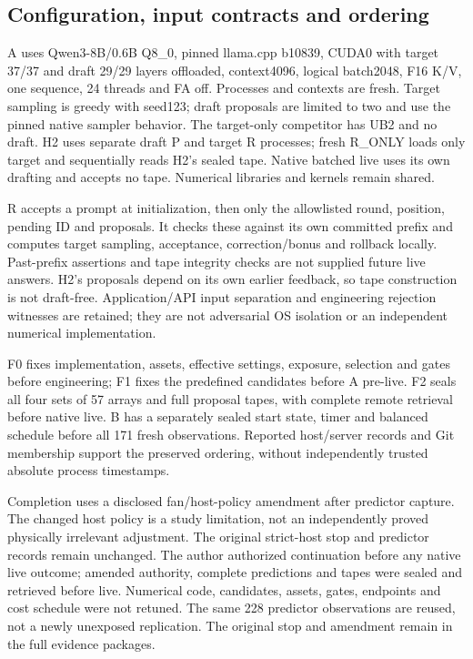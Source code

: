 \subsection{Configuration, input contracts and ordering}
A uses Qwen3-8B/0.6B Q8\_0, pinned llama.cpp b10839, CUDA0 with target 37/37 and draft 29/29 layers offloaded, context4096, logical batch2048, F16 K/V, one sequence, 24 threads and FA off. Processes and contexts are fresh. Target sampling is greedy with seed123; draft proposals are limited to two and use the pinned native sampler behavior. The target-only competitor has UB2 and no draft. H2 uses separate draft P and target R processes; fresh R\_ONLY loads only target and sequentially reads H2's sealed tape. Native batched live uses its own drafting and accepts no tape. Numerical libraries and kernels remain shared.

R accepts a prompt at initialization, then only the allowlisted round, position, pending ID and proposals. It checks these against its own committed prefix and computes target sampling, acceptance, correction/bonus and rollback locally. Past-prefix assertions and tape integrity checks are not supplied future live answers. H2's proposals depend on its own earlier feedback, so tape construction is not draft-free. Application/API input separation and engineering rejection witnesses are retained; they are not adversarial OS isolation or an independent numerical implementation.

F0 fixes implementation, assets, effective settings, exposure, selection and gates before engineering; F1 fixes the predefined candidates before A pre-live. F2 seals all four sets of 57 arrays and full proposal tapes, with complete remote retrieval before native live. B has a separately sealed start state, timer and balanced schedule before all 171 fresh observations. Reported host/server records and Git membership support the preserved ordering, without independently trusted absolute process timestamps.

Completion uses a disclosed fan/host-policy amendment after predictor capture. The changed host policy is a study limitation, not an independently proved physically irrelevant adjustment. The original strict-host stop and predictor records remain unchanged. The author authorized continuation before any native live outcome; amended authority, complete predictions and tapes were sealed and retrieved before live. Numerical code, candidates, assets, gates, endpoints and cost schedule were not retuned. The same 228 predictor observations are reused, not a newly unexposed replication. The original stop and amendment remain in the full evidence packages.

